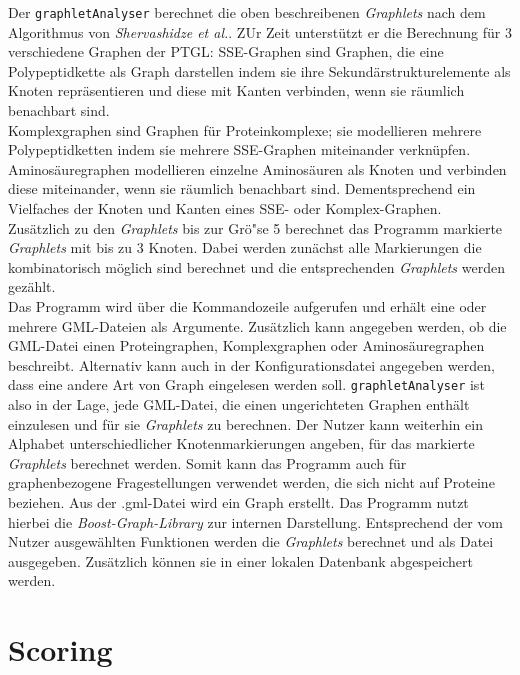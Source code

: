 \documentclass{report}
\begin{document}
Der \texttt{graphletAnalyser} berechnet die oben beschreibenen \textit{Graphlets} nach dem Algorithmus von \emph{Shervashidze et al.}. ZUr Zeit unterst\"utzt er die Berechnung f\"ur 3 verschiedene Graphen der PTGL: 
SSE-Graphen sind Graphen, die eine Polypeptidkette als Graph darstellen indem sie ihre Sekund\"arstrukturelemente als Knoten repr\"asentieren und diese mit Kanten verbinden, wenn sie r\"aumlich benachbart sind. \\
Komplexgraphen sind Graphen f\"ur Proteinkomplexe; sie modellieren mehrere Polypeptidketten indem sie mehrere SSE-Graphen miteinander verkn\"upfen. \\
Aminos\"auregraphen modellieren einzelne Aminos\"auren als Knoten und verbinden diese miteinander, wenn sie r\"aumlich benachbart sind. Dementsprechend ein Vielfaches der Knoten und Kanten eines SSE- oder Komplex-Graphen. \\
Zus\"atzlich zu den \textit{Graphlets} bis zur Gr\"o"se 5 berechnet das Programm markierte \textit{Graphlets} mit bis zu 3 Knoten. Dabei werden zun\"achst alle Markierungen die kombinatorisch m\"oglich sind berechnet und die entsprechenden \textit{Graphlets} werden gez\"ahlt.\\
Das Programm wird \"uber die Kommandozeile aufgerufen und erh\"alt eine oder mehrere GML-Dateien als Argumente.
Zus\"atzlich kann angegeben werden, ob die GML-Datei einen Proteingraphen, Komplexgraphen oder Aminos\"auregraphen beschreibt.
Alternativ kann auch in der Konfigurationsdatei angegeben werden, dass eine andere Art von Graph eingelesen werden soll.
\texttt{graphletAnalyser} ist also in der Lage, jede GML-Datei, die einen ungerichteten Graphen enth\"alt einzulesen und f\"ur sie \textit{Graphlets} zu berechnen. Der Nutzer kann weiterhin ein Alphabet unterschiedlicher Knotenmarkierungen angeben, f\"ur das markierte \textit{Graphlets} berechnet werden. Somit kann das Programm auch f\"ur graphenbezogene Fragestellungen verwendet werden, die sich nicht auf Proteine beziehen.
Aus der .gml-Datei wird ein Graph erstellt. Das Programm nutzt hierbei die \textit{Boost-Graph-Library} zur internen Darstellung. Entsprechend der vom Nutzer ausgew\"ahlten Funktionen werden die \textit{Graphlets} berechnet und als Datei ausgegeben. Zus\"atzlich k\"onnen sie in einer lokalen Datenbank abgespeichert werden.


\section{Scoring}
\end{document}
